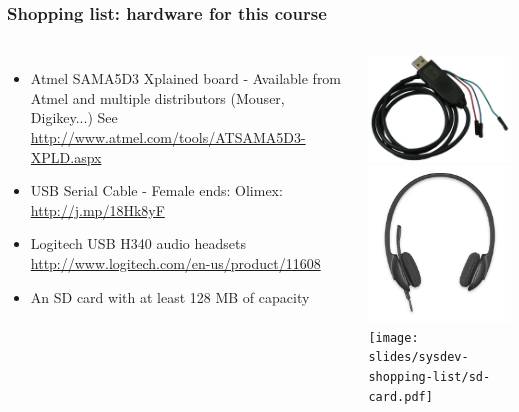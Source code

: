 \begin{frame}
\frametitle{Shopping list: hardware for this course}
  \begin{columns}
    \footnotesize
    \begin{itemize}
      \item Atmel SAMA5D3 Xplained board - Available from Atmel and
 	    multiple distributors (Mouser, Digikey...)
	    See \url{http://www.atmel.com/tools/ATSAMA5D3-XPLD.aspx}
      \item USB Serial Cable - Female ends:
	    Olimex: \url{http://j.mp/18Hk8yF} \\
      \item Logitech USB H340 audio headsets
	    \url{http://www.logitech.com/en-us/product/11608}
      \item An SD card with at least 128 MB of capacity
    \end{itemize}
    \includegraphics[height=0.20\textheight]{slides/sysdev-shopping-list/usb-serial-cable-female.png} \\
    \includegraphics[height=0.15\textheight]{slides/sysdev-shopping-list/logitech-h340.png} \\
    \texttt{[image: slides/sysdev-shopping-list/sd-card.pdf]}
  \end{columns}
\end{frame}
